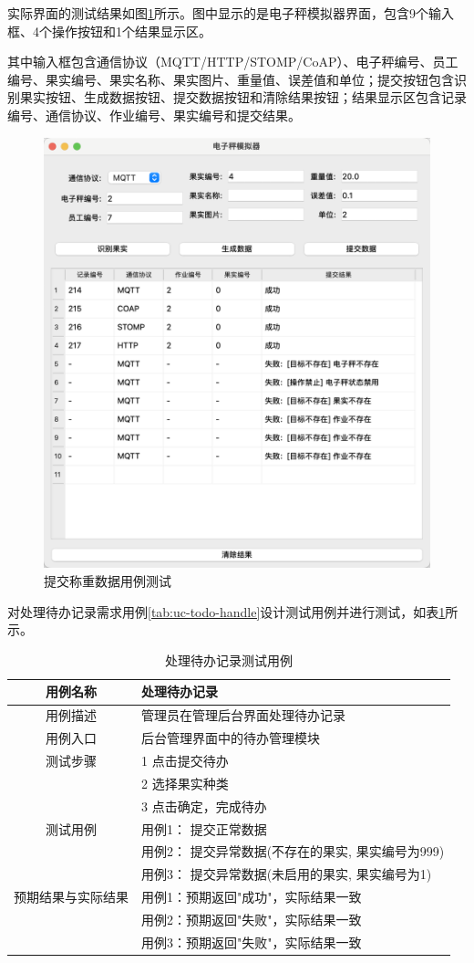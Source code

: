 实际界面的测试结果如图\ref{fig:weigh-submit-result}所示。图中显示的是电子秤模拟器界面，包含9个输入框、4个操作按钮和1个结果显示区。

其中输入框包含通信协议（MQTT/HTTP/STOMP/CoAP）、电子秤编号、员工编号、果实编号、果实名称、果实图片、重量值、误差值和单位；提交按钮包含识别果实按钮、生成数据按钮、提交数据按钮和清除结果按钮；结果显示区包含记录编号、通信协议、作业编号、果实编号和提交结果。

\begin{figure}[H]
    \centering
    \includegraphics[width=0.8\linewidth]{../result/weigh-submit-result.png}
    \caption{提交称重数据用例测试}
    \label{fig:weigh-submit-result}
\end{figure}

对处理待办记录需求用例\ref{tab:uc-todo-handle}设计测试用例并进行测试，如表\ref{tab:uc-todo-handle-test}所示。

\begin{longtable}[ht]{|c|p{8cm}|}
\caption{处理待办记录测试用例}
\label{tab:uc-todo-handle-test}
\\
\hline
用例名称 & 处理待办记录 \\
\hline
用例描述 & 管理员在管理后台界面处理待办记录 \\
\hline
用例入口 & 后台管理界面中的待办管理模块 \\
\hline
测试步骤 & 1 点击提交待办 \\
& 2 选择果实种类 \\
& 3 点击确定，完成待办 \\
\hline
测试用例 & 用例1： 提交正常数据 \\
& 用例2： 提交异常数据(不存在的果实, 果实编号为999) \\
& 用例3： 提交异常数据(未启用的果实, 果实编号为1) \\
\hline
预期结果与实际结果 & 用例1：预期返回"成功"，实际结果一致 \\
& 用例2：预期返回"失败"，实际结果一致 \\
& 用例3：预期返回"失败"，实际结果一致 \\
\hline
\end{longtable}

